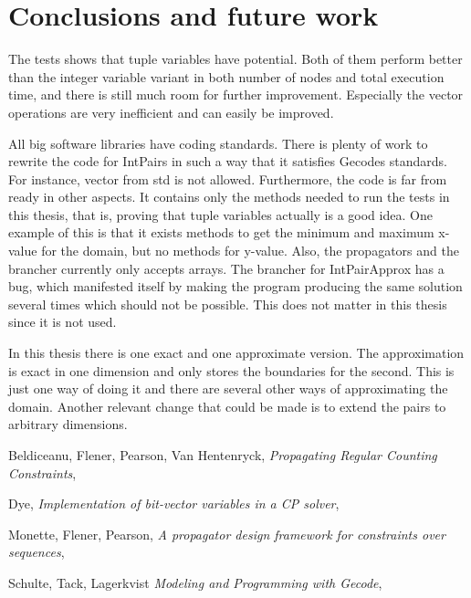 \documentclass[a4paper,11pt]{article}
\begin{document}
\section{Conclusions and future work}
The tests shows that tuple variables have potential. Both of them perform better than the integer variable variant in both number of nodes and total execution time, and there is still much room for further improvement. Especially the vector operations are very inefficient and can easily be improved.

All big software libraries have coding standards. There is plenty of work to rewrite the code for IntPairs in such a way that it satisfies Gecodes standards. For instance, vector from std is not allowed. Furthermore, the code is far from ready in other aspects. It contains only the methods needed to run the tests in this thesis, that is, proving that tuple variables actually is a good idea. One example of this is that it exists methods to get the minimum and maximum x-value for the domain, but no methods for y-value. Also, the propagators and the brancher currently only accepts arrays. The brancher for IntPairApprox has a bug, which manifested itself by making the program producing the same solution several times which should not be possible. This does not matter in this thesis since it is not used.

In this thesis there is one exact and one approximate version. The approximation is exact in one dimension and only stores the boundaries for the second. This is just one way of doing it and there are several other ways of approximating the domain. Another relevant change that could be made is to extend the pairs to arbitrary dimensions.

\begin{thebibliography}{9}

  Beldiceanu, Flener, Pearson, Van Hentenryck,
  \emph{Propagating Regular Counting Constraints},

  Dye,
  \emph{Implementation of bit-vector variables in a CP solver},

  Monette, Flener, Pearson,
  \emph{A propagator design framework for constraints over sequences},

  Schulte, Tack, Lagerkvist
  \emph{Modeling and Programming with Gecode},

\end{thebibliography}
\end{document}
